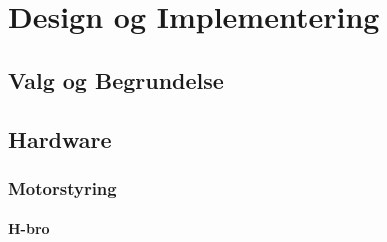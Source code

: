 \chapter{Design og Implementering}

\section{Valg og Begrundelse}

\section{Hardware}

\subsection{Motorstyring}
\subsubsection{H-bro}
